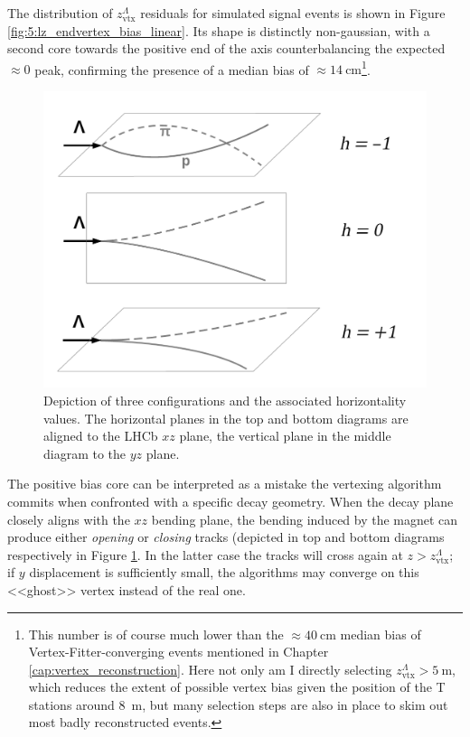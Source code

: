 The distribution of $z_\text{vtx}^\Lambda$ residuals for simulated signal events is shown in Figure \ref{fig:5:lz_endvertex_bias_linear}.
Its shape is distinctly non-gaussian, with a second core towards the positive end of the axis counterbalancing the expected $\approx 0$ peak, confirming the presence of a median bias of $\approx \SI{14}{\centi\meter}$\footnote{This number is of course much lower than the $\approx \SI{40}{\centi\meter}$ median bias of Vertex-Fitter-converging events mentioned in Chapter \ref{cap:vertex_reconstruction}. Here not only am I directly selecting $z_\text{vtx}^\Lambda > \SI{5}{\meter}$, which reduces the extent of possible vertex bias given the position of the T stations around \SI{8}{\meter}, but many selection steps are also in place to skim out most badly reconstructed events.}.

\begin{figure}[t]
	\centering
	\includegraphics[width=.7\textwidth]{graphics/04-event_selection/horizontality_illustration_bw.png}
	\caption{Depiction of three \lambdadecay configurations and the associated horizontality values. The horizontal planes in the top and bottom diagrams are aligned to the LHCb $xz$ plane, the vertical plane in the middle diagram to the $yz$ plane.}
	\label{fig:4:horizontality_explanation}
\end{figure}

The positive bias core can be interpreted as a mistake the vertexing algorithm commits when confronted with a specific decay geometry.
When the \lambdadecay decay plane closely aligns with the $xz$ bending plane, the bending induced by the magnet can produce either \textit{opening} or \textit{closing} tracks (depicted in top and bottom diagrams respectively in Figure \ref{fig:4:horizontality_explanation}.
In the latter case the tracks will cross again at $z>z_\text{vtx}^\Lambda$;
if $y$ displacement is sufficiently small, the algorithms may converge on this <<ghost>> vertex instead of the real one.


